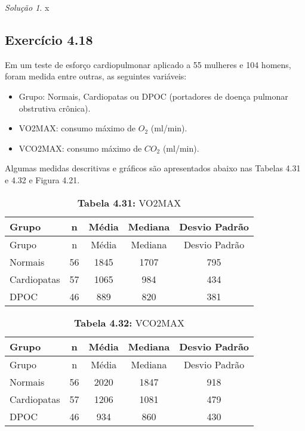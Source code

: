\documentclass[
]{latex/krantz}
\providecommand{\tightlist}{%
  \setlength{\itemsep}{0pt}\setlength{\parskip}{0pt}}
\theoremstyle{definition}
\theoremstyle{definition}
\theoremstyle{definition}
\theoremstyle{definition}
\theoremstyle{remark}
\newtheorem*{solution}{Solução}
\begin{document}
\begin{solution}
x
\end{solution}

\hypertarget{exr4-18}{%
\subsection*{Exercício 4.18}\label{exr4-18}}

Em um teste de esforço cardiopulmonar aplicado a 55 mulheres e 104 homens, foram medida entre outras, as seguintes variáveis:

\begin{itemize}
\tightlist
\item
  Grupo: Normais, Cardiopatas ou DPOC (portadores de doença pulmonar obstrutiva crônica).
\item
  VO2MAX: consumo máximo de \(O_2\) (ml/min).
\item
  VCO2MAX: consumo máximo de \(CO_2\) (ml/min).
\end{itemize}

Algumas medidas descritivas e gráficos são apresentados abaixo nas Tabelas 4.31 e 4.32 e Figura 4.21.

\begin{longtable}[]{@{}lcccc@{}}
\caption{\textbf{Tabela 4.31:} VO2MAX}\tabularnewline
\toprule\noalign{}
Grupo & n & Média & Mediana & Desvio Padrão \\
\midrule\noalign{}
\endfirsthead
\toprule\noalign{}
Grupo & n & Média & Mediana & Desvio Padrão \\
\midrule\noalign{}
\endhead
\bottomrule\noalign{}
\endlastfoot
Normais & 56 & 1845 & 1707 & 795 \\
Cardiopatas & 57 & 1065 & 984 & 434 \\
DPOC & 46 & 889 & 820 & 381 \\
\end{longtable}

\begin{longtable}[]{@{}lcccc@{}}
\caption{\textbf{Tabela 4.32:} VCO2MAX}\tabularnewline
\toprule\noalign{}
Grupo & n & Média & Mediana & Desvio Padrão \\
\midrule\noalign{}
\endfirsthead
\toprule\noalign{}
Grupo & n & Média & Mediana & Desvio Padrão \\
\midrule\noalign{}
\endhead
\bottomrule\noalign{}
\endlastfoot
Normais & 56 & 2020 & 1847 & 918 \\
Cardiopatas & 57 & 1206 & 1081 & 479 \\
DPOC & 46 & 934 & 860 & 430 \\
\end{longtable}
\end{document}
